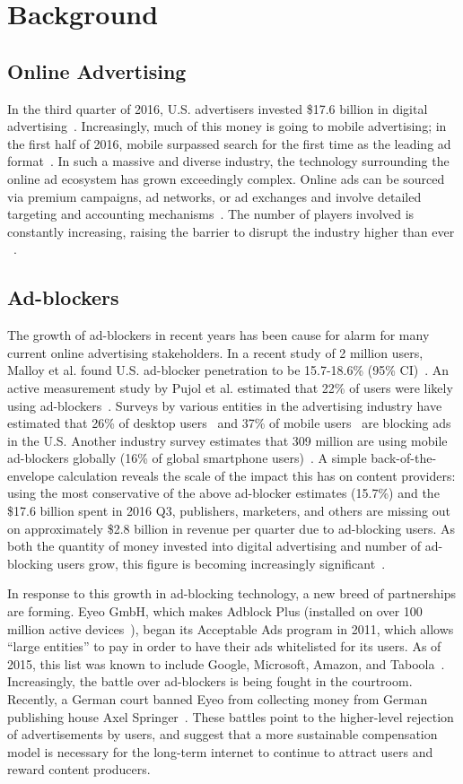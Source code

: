 \section{Background}
\subsection{Online Advertising}
In the third quarter of 2016, U.S. advertisers invested \$17.6 billion
in digital advertising~\cite{iabq3}. Increasingly, much of this money
is going to mobile advertising; in the first half of 2016, mobile
surpassed search for the first time as the leading ad
format~\cite{iab2016}. In such a massive and diverse industry, the
technology surrounding the online ad ecosystem has grown exceedingly
complex. Online ads can be sourced via premium campaigns, ad networks,
or ad exchanges and involve detailed targeting and accounting
mechanisms~\cite{adscape}. The number of players involved is
constantly increasing, raising the barrier to disrupt the industry
higher than ever ~\cite{lumascape}.

\subsection{Ad-blockers}
The growth of ad-blockers in recent years has been cause for alarm for
many current online advertising stakeholders. In a recent study of 2
million users, Malloy et al. found U.S. ad-blocker penetration to be
15.7-18.6\% (95\% CI)~\cite{malloy}. An active measurement study by
Pujol et al. estimated that 22\% of users were likely using
ad-blockers~\cite{pujol}. Surveys by various entities in the
advertising industry have estimated that 26\% of desktop
users~\cite{iab-blockers} and 37\% of mobile users~\cite{gwi} are
blocking ads in the U.S. Another industry survey estimates that 309
million are using mobile ad-blockers globally (16\% of global
smartphone users)~\cite{pagefair}. A simple back-of-the-envelope
calculation reveals the scale of the impact this has on content
providers: using the most conservative of the above ad-blocker
estimates (15.7\%) and the \$17.6 billion spent in 2016 Q3,
publishers, marketers, and others are missing out on approximately
\$2.8 billion in revenue per quarter due to ad-blocking users. As both
the quantity of money invested into digital advertising and number of
ad-blocking users grow, this figure is becoming increasingly
significant~\cite{iab2016}.

In response to this growth in ad-blocking technology, a new breed of
partnerships are forming. Eyeo GmbH, which makes Adblock Plus
(installed on over 100 million active devices~\cite{abp}), began its
Acceptable Ads program in 2011, which allows “large entities” to pay
in order to have their ads whitelisted for its users. As of 2015, this
list was known to include Google, Microsoft, Amazon, and
Taboola~\cite{whitelist}. Increasingly, the battle over ad-blockers is
being fought in the courtroom. Recently, a German court banned Eyeo
from collecting money from German publishing house Axel
Springer~\cite{axel}. These battles point to the higher-level
rejection of advertisements by users, and suggest that a more
sustainable compensation model is necessary for the long-term internet
to continue to attract users and reward content producers.
